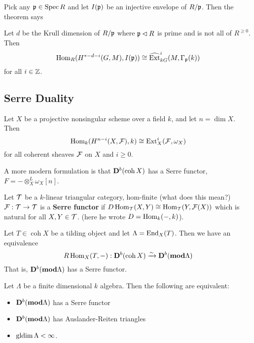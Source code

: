 \documentclass[12pt]{article}
\newcommand{\p}{\frakp}
\DeclareMathOperator{\Spec}{Spec}
\begin{document}
Pick any $\p\in\Spec R$ and let $I(\p)$ be an injective envelope of $R/\p$. Then the theorem says 
\begin{thm}[BIKP, '19]
	Let $d$ be the Krull dimension of $R/\p$ where $\p\lhd R$ is prime and is not all of $R^{\ge 0}$. Then 
	\[\Hom_R(H^{\ast-d-i}(G,M),I(\p))\cong\widehat\Ext_{kG}^i(M,\Gamma_\p(k))\]
	for all $i\in\mathbb{Z}$.
\end{thm}

\subsection{Serre Duality}
\begin{thm}
Let $X$ be a projective nonsingular scheme over a field $k$, and let $n=\dim X$. Then 
\[\operatorname{Hom}_k(H^{n-i}(X,\mathcal{F}),k)\cong\operatorname{Ext}_X^i(\mathcal{F},\omega_X)\]
for all coherent sheaves $\mathcal{F}$ on $X$ and $i\ge 0$.
\end{thm}

A more modern formulation is that $\mathbf{D}^b(\operatorname{coh}X)$ has a Serre functor, $F=-\otimes_X^L\omega_X[n]$.

\begin{defn}
	Let $\mathcal{T}$ be a $k$-linear triangular category, hom-finite (what does this mean?) $\mathcal{F}:\mathcal{T}\to\mathcal{T}$ is a \textbf{Serre functor}
	if $D\operatorname{Hom}_{\mathcal{T}}(X,Y)\cong \operatorname{Hom}_{\mathcal{T}}(Y,\mathcal{F}(X))$ which is natural for all $X,Y\in\mathcal{T}$. (here he wrote $D=\operatorname{Hom}_k(-,k)$).
\end{defn}

Let $T\in\operatorname{coh}X$ be a tilding object and let $\Lambda=\operatorname{End}_X(T)$. Then we have an equivalence 
\[R\operatorname{Hom}_X(T,-):\mathbf{D}^b(\operatorname{coh}X)\xrightarrow{\sim}\mathbf{D}^b(\mathbf{mod}\Lambda)\]
That is, $\mathbf{D}^b(\mathbf{mod}\Lambda)$ has a Serre functor.

\begin{thm}
	Let $\Lambda$ be a finite dimensional $k$ algebra. Then the following are equivalent:
	\begin{itemize}
		\item $\mathbf{D}^b(\mathbf{mod}\Lambda)$ has a Serre functor
		\item $\mathbf{D}^b(\mathbf{mod}\Lambda)$ has Auslander-Reiten triangles
		\item $\operatorname{gldim} \Lambda<\infty$.
	\end{itemize}
\end{thm}
\end{document}

